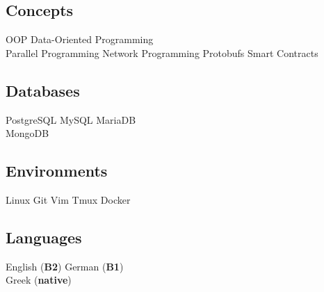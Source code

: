 \documentclass[]{deedy-resume-openfont}
\begin{document}
\begin{minipage}[t]{0.33\textwidth}
\subsection{Concepts}
OOP \textbullet{}
Data-Oriented Programming \\
Parallel Programming \textbullet{}
Network Programming \textbullet{}
Protobufs \textbullet{}
Smart Contracts \\
\sectionsep

\subsection{Databases}
PostgreSQL \textbullet{}
MySQL \textbullet{}
MariaDB \\
MongoDB \\
\sectionsep

\subsection{Environments}
Linux \textbullet{}
Git \textbullet{}
Vim \textbullet{}
Tmux \textbullet{}
Docker \\
\sectionsep

\subsection{Languages}
English (\textbf{B2}) \textbullet{}
German (\textbf{B1}) \\
Greek (\textbf{native})

%
%

\end{minipage}
\hfill
\end{document}

